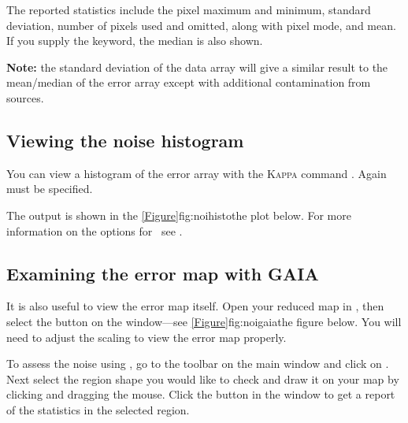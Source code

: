 \documentclass[11pt,oneside,chapters]{starlink}
\begin{document}
The reported statistics include the pixel maximum and minimum,
standard deviation, number of pixels used and omitted, along with
pixel mode, and mean.  If you supply the  keyword,
the median is also shown.
\begin{terminalv}
\end{terminalv}

\textbf{Note:} the standard deviation of the data array will give a
similar result to the mean/median of the error array except with
additional contamination from sources.



\subsection{Viewing the noise histogram}

You can view a histogram of the error array with the
\textsc{Kappa} command \histogram. Again  must be
specified.

\begin{terminalv}
\end{terminalv}
The output is shown in the \cref{Figure}{fig:noihisto}{the plot below}.
For more information on the options for \histogram\ see
\kappasun.


\subsection{Examining the error map with GAIA}

It is also useful to view the error map itself. Open your reduced map
in \gaia, then select the  button on the  window---see \cref{Figure}{fig:noigaia}{the figure
below}. You will need to adjust the scaling to view the error map properly.

To assess the noise using \gaia, go to the toolbar on the main window
and click on \linebreak[4]. Next select the region shape you would like to check and
draw it on your map by clicking and dragging the mouse. Click the
 button in the 
window to get a report of the statistics in the selected region.
\end{document}
